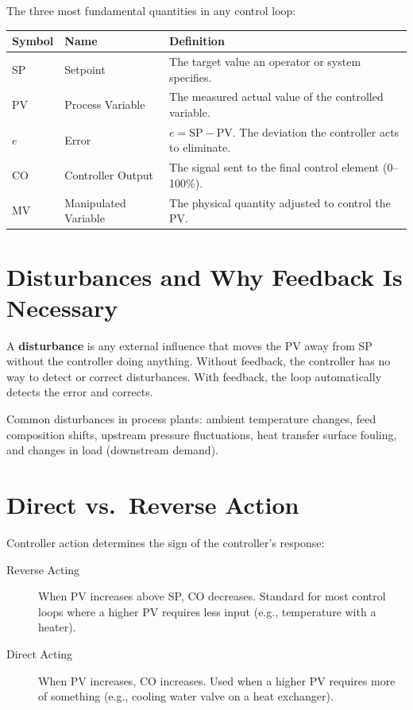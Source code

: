 \documentclass[12pt,twoside,openright]{memoir}
\begin{document}
The three most fundamental quantities in any control loop:

\begin{center}
\begin{tabular}{@{}L{2.5cm}L{3.5cm}L{8cm}@{}}
\toprule
{}
\textbf{Symbol} & \textbf{Name} & \textbf{Definition} \\
\midrule
SP & Setpoint & The target value an operator or system specifies. \\
PV & Process Variable & The measured actual value of the controlled variable. \\
$e$ & Error & $e = \text{SP} - \text{PV}$. The deviation the controller acts to eliminate. \\
CO & Controller Output & The signal sent to the final control element (0--100\%). \\
MV & Manipulated Variable & The physical quantity adjusted to control the PV. \\
\bottomrule
\end{tabular}
\end{center}

\section{Disturbances and Why Feedback Is Necessary}

A \textbf{disturbance} is any external influence that moves the PV away from SP without the controller doing anything. Without feedback, the controller has no way to detect or correct disturbances. With feedback, the loop automatically detects the error and corrects.

Common disturbances in process plants: ambient temperature changes, feed composition shifts, upstream pressure fluctuations, heat transfer surface fouling, and changes in load (downstream demand).

\section{Direct vs.\ Reverse Action}

Controller action determines the sign of the controller's response:

\begin{description}
  \item[Reverse Acting] When PV increases above SP, CO decreases. Standard for most control loops where a higher PV requires less input (e.g., temperature with a heater).
  \item[Direct Acting] When PV increases, CO increases. Used when a higher PV requires more of something (e.g., cooling water valve on a heat exchanger).
\end{description}
\end{document}
